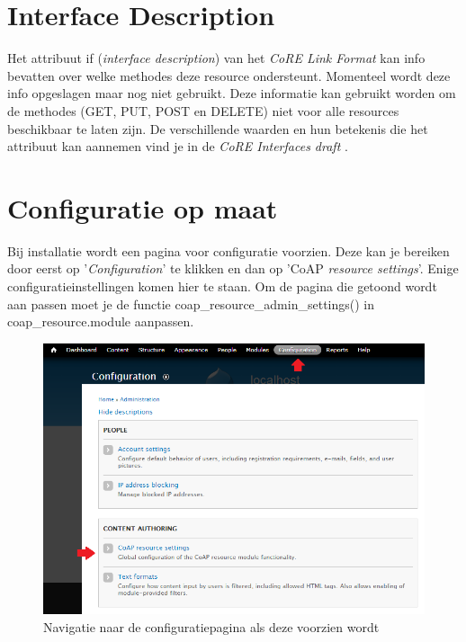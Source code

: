 \section{Interface Description}
Het attribuut if (\textit{interface description}) van het \textit{CoRE Link Format} kan info bevatten over welke methodes deze resource ondersteunt. Momenteel wordt deze info opgeslagen maar nog niet gebruikt. Deze informatie kan gebruikt worden om de methodes (GET, PUT, POST en DELETE) niet voor alle resources beschikbaar te laten zijn. De verschillende waarden en hun betekenis die het attribuut kan aannemen vind je in de \textit{CoRE Interfaces draft} \cite{coreInterfaces}.

\section{Configuratie op maat} \label{configuratie}
Bij installatie wordt een pagina voor configuratie voorzien. Deze kan je bereiken door eerst op '\textit{Configuration}' te klikken en dan op 'CoAP \textit{resource settings}'. Enige configuratieinstellingen komen hier te staan. Om de pagina die getoond wordt aan passen moet je de functie coap\_resource\_admin\_settings() in coap\_resource.module aanpassen.
\begin{figure}[h!]
\vspace{10pt}
\includegraphics[width=1\textwidth]{fig/Configuratie}
\vspace{-30pt}
\caption{Navigatie naar de configuratiepagina als deze voorzien wordt}
\vspace{-10pt}
\end{figure}

